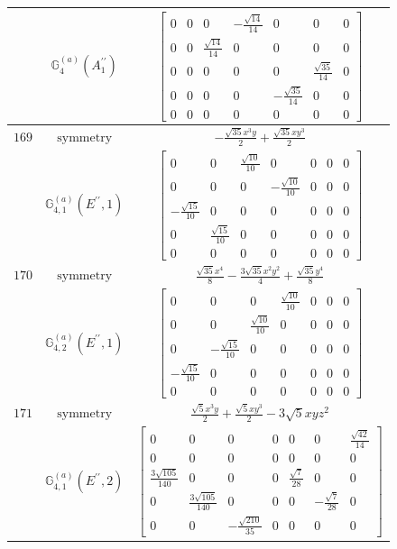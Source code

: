 \documentclass[fleqn,8pt,landscape]{jsarticle}
\begin{document}
\begin{longtable}{ccc}
$  $ & $ \mathbb{G}_{4}^{(a)}(A_{1}^{\prime\prime}) $ & $ \begin{bmatrix} 0 & 0 & 0 & - \frac{\sqrt{14}}{14} & 0 & 0 & 0 \\ 0 & 0 & \frac{\sqrt{14}}{14} & 0 & 0 & 0 & 0 \\ 0 & 0 & 0 & 0 & 0 & \frac{\sqrt{35}}{14} & 0 \\ 0 & 0 & 0 & 0 & - \frac{\sqrt{35}}{14} & 0 & 0 \\ 0 & 0 & 0 & 0 & 0 & 0 & 0 \end{bmatrix} $ \\ \hline
$ 169 $ & $ \text{symmetry} $ & $ - \frac{\sqrt{35} x^{3} y}{2} + \frac{\sqrt{35} x y^{3}}{2} $ \\
$  $ & $ \mathbb{G}_{4,1}^{(a)}(E^{\prime\prime},1) $ & $ \begin{bmatrix} 0 & 0 & \frac{\sqrt{10}}{10} & 0 & 0 & 0 & 0 \\ 0 & 0 & 0 & - \frac{\sqrt{10}}{10} & 0 & 0 & 0 \\ - \frac{\sqrt{15}}{10} & 0 & 0 & 0 & 0 & 0 & 0 \\ 0 & \frac{\sqrt{15}}{10} & 0 & 0 & 0 & 0 & 0 \\ 0 & 0 & 0 & 0 & 0 & 0 & 0 \end{bmatrix} $ \\ \hline
$ 170 $ & $ \text{symmetry} $ & $ \frac{\sqrt{35} x^{4}}{8} - \frac{3 \sqrt{35} x^{2} y^{2}}{4} + \frac{\sqrt{35} y^{4}}{8} $ \\
$  $ & $ \mathbb{G}_{4,2}^{(a)}(E^{\prime\prime},1) $ & $ \begin{bmatrix} 0 & 0 & 0 & \frac{\sqrt{10}}{10} & 0 & 0 & 0 \\ 0 & 0 & \frac{\sqrt{10}}{10} & 0 & 0 & 0 & 0 \\ 0 & - \frac{\sqrt{15}}{10} & 0 & 0 & 0 & 0 & 0 \\ - \frac{\sqrt{15}}{10} & 0 & 0 & 0 & 0 & 0 & 0 \\ 0 & 0 & 0 & 0 & 0 & 0 & 0 \end{bmatrix} $ \\ \hline
$ 171 $ & $ \text{symmetry} $ & $ \frac{\sqrt{5} x^{3} y}{2} + \frac{\sqrt{5} x y^{3}}{2} - 3 \sqrt{5} x y z^{2} $ \\
$  $ & $ \mathbb{G}_{4,1}^{(a)}(E^{\prime\prime},2) $ & $ \begin{bmatrix} 0 & 0 & 0 & 0 & 0 & 0 & \frac{\sqrt{42}}{14} \\ 0 & 0 & 0 & 0 & 0 & 0 & 0 \\ \frac{3 \sqrt{105}}{140} & 0 & 0 & 0 & \frac{\sqrt{7}}{28} & 0 & 0 \\ 0 & \frac{3 \sqrt{105}}{140} & 0 & 0 & 0 & - \frac{\sqrt{7}}{28} & 0 \\ 0 & 0 & - \frac{\sqrt{210}}{35} & 0 & 0 & 0 & 0 \end{bmatrix} $ \\ \hline

\end{longtable}
\end{document}
